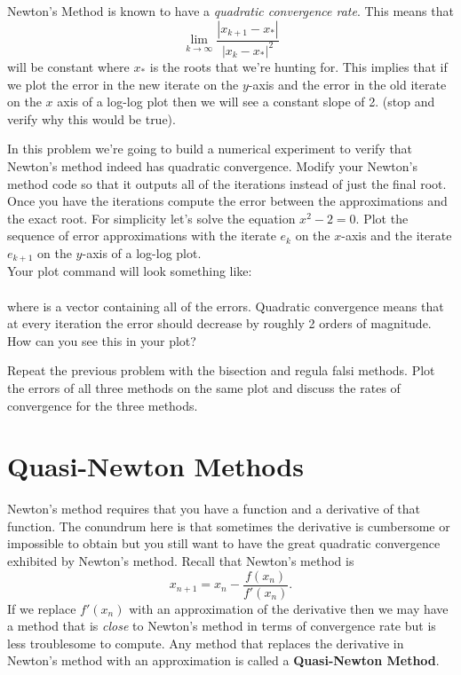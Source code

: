 \begin{problem}\label{prob:newton_convergence}
    Newton's Method is known to have a {\it quadratic convergence rate}.  This means that 
    \[ \lim_{k \to \infty} \frac{|x_{k+1} - x_*|}{|x_k - x_*|^2} \]
    will be constant where $x_*$ is the roots that we're hunting for.  This implies that
    if we plot the error in the new iterate on the $y$-axis and the error in the old
    iterate on the $x$ axis of a log-log plot then we will see a constant slope of 2.
    (stop and verify why this would be true).
    
    In this problem we're going to build a numerical experiment to verify that Newton's
    method indeed has quadratic convergence.  Modify your Newton's method code so that it
    outputs all of the iterations instead of just the final root.  Once you have the
    iterations compute the error between the approximations and the exact root. For
    simplicity let's solve the equation $x^2-2=0$.  Plot the sequence of error
    approximations with the iterate $e_k$ on the $x$-axis and the iterate $e_{k+1}$ on the
    $y$-axis of a log-log plot.  \\ Your plot command will look something like: \\
     \\where {} is a vector
    containing all of the errors.  Quadratic convergence means that at every iteration the
    error should decrease by roughly 2 orders of magnitude.  How can you see this in your
    plot?
\end{problem}


\begin{problem}
    Repeat the previous problem with the bisection and regula falsi
    methods.  Plot the errors of all three methods on the same plot and discuss the rates
    of convergence for the three methods.
\end{problem}


\section{Quasi-Newton Methods}
Newton's method requires that you have a function and a derivative of that function.  The
conundrum here is that sometimes the derivative is cumbersome or impossible to obtain but
you still want to have the great quadratic convergence exhibited by Newton's method.
Recall that Newton's method is
\[ x_{n+1} = x_n - \frac{f(x_n)}{f'(x_n)}. \]
If we replace $f'(x_n)$ with an approximation of the derivative then we may have a method
that is {\it close} to Newton's method in terms of convergence rate but is less
troublesome to compute. Any method that replaces the derivative in Newton's method with an
approximation is called a {\bf Quasi-Newton Method}.

